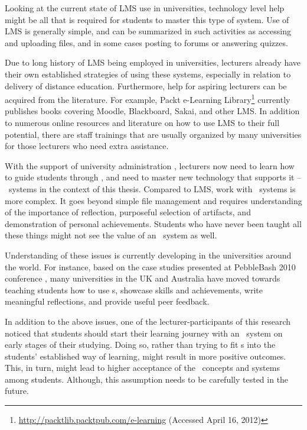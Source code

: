 Looking at the current state of LMS use in universities, technology level help
might be all that is required for students to master this type of system. Use of
LMS is generally simple, and can be summarized in such activities as accessing
and uploading files, and in some cases posting to forums or answering quizzes.

Due to long history of LMS being employed in universities, lecturers already
have their own established strategies of using these systems, especially in
relation to delivery of distance education. Furthermore, help for aspiring
lecturers can be acquired from the literature. For example, Packt e-Learning
Library\footnote{\url{http://packtlib.packtpub.com/e-learning} (Accessed April
16, 2012)} currently publishes books covering Moodle, Blackboard, Sakai, and
other LMS. In addition to numerous online resources and literature on how to use
LMS to their full potential, there are staff trainings that are usually
organized by many universities for those lecturers who need extra assistance.

With the support of university administration \citep{DiBenedetto2005}, 
lecturers now need to learn how to guide students through \LLLsn, and need to
master new technology that supports it \citep{Levin2008} -- \ep~systems in the
context of this thesis. Compared to LMS, work with \ep~systems is more complex.
It goes beyond simple file management and requires understanding of the
importance of reflection, purposeful selection of artifacts, and demonstration
of personal achievements. Students who have never been taught all these things
might not see the value of an \ep~system as well.

Understanding of these issues is currently developing in the universities
around the world. For instance, based on the case studies presented at
PebbleBash 2010 conference \citep{PebbleLearningLtd2010a}, many universities in
the UK and Australia have moved towards teaching students how to use \ep s,
showcase skills and achievements, write meaningful reflections, and provide
useful peer feedback.

In addition to the above issues, one of the lecturer-participants of this
research noticed that students should start their learning journey with an
\ep~system on early stages of their studying. Doing so, rather than trying to
fit \ep s into the students' established way of learning, might result in more
positive outcomes. This, in turn, might lead to higher acceptance of the
\ep~concepts and systems among students. Although, this assumption needs to
be carefully tested in the future.

